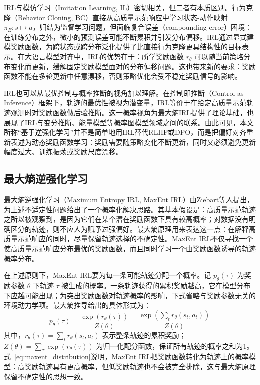 IRL与模仿学习（Imitation Learning, IL）密切相关，但二者有本质区别\cite{li2024imitation}。行为克隆（Behavior Cloning, BC）直接从高质量示范响应中学习状态-动作映射 $\pi_E: s \mapsto a$，归结为监督学习问题，但面临复合误差（compounding error）困境：在训练分布之外，微小的预测误差可能不断累积并引发分布偏移。IRL通过显式建模奖励函数，为跨状态或跨分布泛化提供了比直接行为克隆更具结构性的目标表示。在大语言模型对齐中，IRL的优势在于：所学奖励函数 $r_\theta$ 可以随当前策略分布变化而更新，缓解固定奖励模型面对的分布偏移问题。这也带来新的要求：奖励函数不能在多轮更新中任意漂移，否则策略优化会受不稳定奖励信号的影响。

IRL也可以从最优控制与概率推断的视角加以理解。在控制即推断（Control as Inference）框架下\cite{ziebart2008maximum}，轨迹的最优性被视为潜变量，IRL等价于在给定高质量示范轨迹观测时对奖励函数做后验推断。这一概率视角为最大熵IRL提供了理论基础，也展现了IRL与变分推断、能量模型等概率图模型领域之间的联系。由此可见，本文所称“基于逆强化学习”并不是简单地用IRL替代RLHF或DPO，而是把偏好对齐重新表述为动态奖励函数学习：奖励需要随策略变化不断更新，同时又必须避免更新幅度过大、训练振荡或奖励尺度漂移。

\subsection{最大熵逆强化学习}

最大熵逆强化学习（Maximum Entropy IRL, MaxEnt IRL）由Ziebart等人\cite{ziebart2008maximum}提出，为上述不适定性问题给出了一个概率化解决思路。其基本假设是：高质量示范轨迹之所以被观察到，是因为它们在某个潜在奖励函数下具有较高概率；对数据没有明确区分的轨迹，则不应人为赋予过强偏好。最大熵原理用来表达这一点：在解释高质量示范响应的同时，尽量保留轨迹选择的不确定性。MaxEnt IRL不仅寻找一个使高质量示范响应分布最优的奖励函数，而且同时学习一个由奖励函数诱导的轨迹概率分布。

在上述原则下，MaxEnt IRL要为每一条可能轨迹分配一个概率。记 $p_\theta(\tau)$ 为奖励参数 $\theta$ 下轨迹 $\tau$ 被生成的概率。一条轨迹获得的累积奖励越高，它在模型分布下应越可能出现；为突出奖励函数对轨迹概率的影响，下式省略与奖励参数无关的环境动力学项。最大熵推导给出的具体形式为：
\begin{equation}
    p_\theta(\tau) = \frac{\exp\left(r_\theta(\tau)\right)}{Z(\theta)} = \frac{\exp\left(\sum_t r_\theta(s_t, a_t)\right)}{Z(\theta)}
    \label{eq:maxent_distribution}
\end{equation}
其中，$r_\theta(\tau)=\sum_t r_\theta(s_t,a_t)$ 表示整条轨迹的累积奖励；$Z(\theta)=\sum_\tau \exp(r_\theta(\tau))$ 为归一化配分函数，保证所有轨迹的概率之和为1。式~\eqref{eq:maxent_distribution}说明，MaxEnt IRL把奖励函数转化为轨迹上的概率模型：高奖励轨迹具有更高概率，但低奖励轨迹也不会被完全排除，这与最大熵原理保留不确定性的思想一致。

